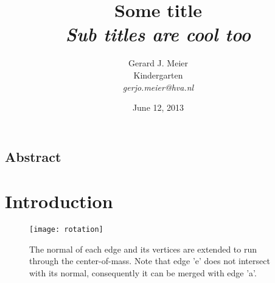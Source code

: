 \documentclass[11pt, a4paper, twoside, onecolumn]{book}
\title{
Some title
\\ \small \textit{Sub titles are cool too}
}
\author{ Gerard J. Meier \\ \small Kindergarten \\ \small \textit{gerjo.meier@hva.nl}}
\date{June 12, 2013}
\begin{document}
\maketitle

\section*{Abstract}

\tableofcontents

\chapter{Introduction}

\begin{figure}[h]
\centering
\texttt{[image: rotation]}
\caption{The normal of each edge and its vertices are extended to run through the center-of-mass. Note that edge 'e' does not intersect with its normal, consequently it can be merged with edge 'a'.}
\label{fig:rotation}
\end{figure}
\end{document}
